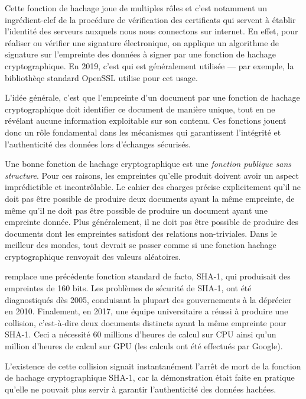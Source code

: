 \documentclass[
    a4paper, 
    12pt, onecolumn,
]{article}
\begin{document}
Cette fonction de hachage joue de multiples rôles et c'est notamment un
ingrédient-clef de la procédure de vérification des certificats qui servent à
établir l'identité des serveurs auxquels nous nous connectons sur internet. En
effet, pour réaliser ou vérifier une signature électronique, on applique un
algorithme de signature sur l'empreinte des données à signer par une fonction de
hachage cryptographique. En 2019, c'est \sha qui est généralement utilisée ---
par exemple, la bibliothèqe standard \textsf{OpenSSL} utilise \sha pour cet usage.

L'idée générale, c'est que l'empreinte d'un document par une fonction de hachage
cryptographique doit identifier ce document de manière unique, tout en ne
révélant aucune information exploitable sur son contenu. Ces fonctions jouent
donc un rôle fondamental dans les mécanismes qui garantissent l'intégrité et
l'authenticité des données lors d'échanges sécurisés.

Une bonne fonction de hachage cryptographique est une \emph{fonction publique
  sans structure}. Pour ces raisons, les empreintes qu'elle produit doivent
avoir un aspect imprédictible et incontrôlable. Le cahier des charges précise
explicitement qu'il ne doit pas être possible de produire deux documents ayant
la même empreinte, de même qu'il ne doit pas être possible de produire un
document ayant une empreinte donnée. Plus généralement, il ne doit pas être
possible de produire des documents dont les empreintes satisfont des relations
non-triviales. Dans le meilleur des mondes, tout devrait se passer comme si une
fonction hachage cryptographique renvoyait des valeurs aléatoires.

\sha remplace une précédente fonction \og standard de facto\fg{},
\textsf{SHA-1}, qui produisait des empreintes de 160 bits. Les problèmes de
sécurité de \textsf{SHA-1}, ont été diagnostiqués dès 2005\cite{WangYY05a},
conduisant la plupart des gouvernements à la déprécier en 2010. Finalement, en
2017, une équipe universitaire a réussi à produire une \og collision\fg{},
c'est-à-dire deux documents distincts ayant la même empreinte pour
\textsf{SHA-1}\cite{StevensBKAM17}. Ceci a nécessité 60 millions d'heures de
calcul sur CPU ainsi qu'un million d'heures de calcul sur GPU (les calculs ont
été effectués par Google).

L'existence de cette collision signait instantanément l'arrêt de mort de la
fonction de hachage cryptographique \textsf{SHA-1}, car la démonstration était
faite en pratique qu'elle ne pouvait plus servir à garantir l'authenticité des
données hachées.
\end{document}
